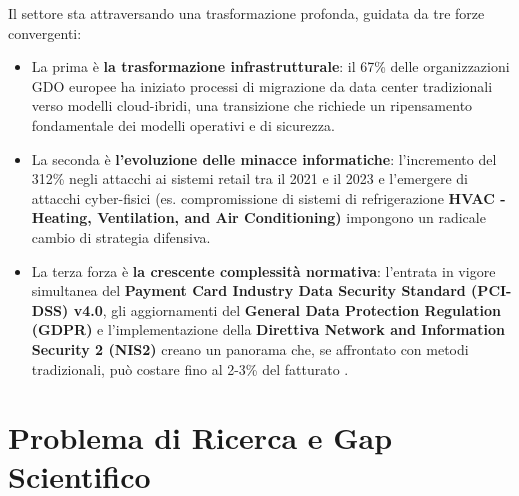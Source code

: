 Il settore sta attraversando una trasformazione profonda, guidata da tre forze convergenti: 
\begin{itemize}
	\item La prima è \textbf{la trasformazione infrastrutturale}: il 67\% delle organizzazioni GDO europee ha iniziato processi di migrazione da data center tradizionali verso modelli cloud-ibridi\autocite{Gartner2024cloud}, una transizione che richiede un ripensamento fondamentale dei modelli operativi e di sicurezza.
	\item La seconda è \textbf{l'evoluzione delle minacce informatiche}: l'incremento del 312\% negli attacchi ai sistemi retail tra il 2021 e il 2023\autocite{enisa2024retail} e l'emergere di attacchi cyber-fisici (es. compromissione di sistemi di refrigerazione \textbf{HVAC - Heating, Ventilation, and Air Conditioning)} impongono un radicale cambio di strategia difensiva. 
	\item La terza forza è \textbf{la crescente complessità normativa}: l'entrata in vigore simultanea del \textbf{Payment Card Industry Data Security Standard (PCI-DSS) v4.0}, gli aggiornamenti del \textbf{General Data Protection Regulation (GDPR)} e l'implementazione della \textbf{Direttiva Network and Information Security 2 (NIS2)} creano un panorama che, se affrontato con metodi tradizionali, può costare fino al 2-3\% del fatturato \autocite{ponemon2024compliance}.
\end{itemize}

\section{Problema di Ricerca e Gap Scientifico}

